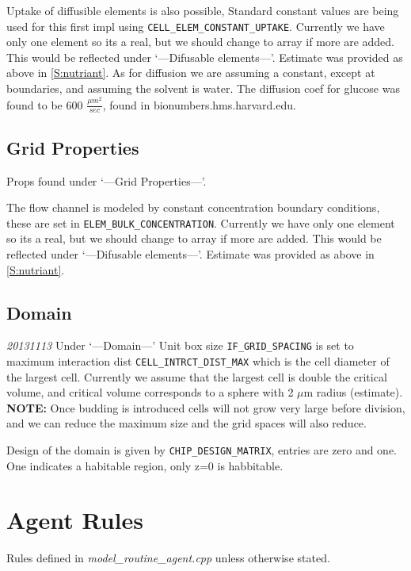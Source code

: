 \documentclass{article}
\begin{document}
Uptake of diffusible elements is also possible,
Standard constant values are being used for this first impl using \texttt{CELL\_ELEM\_CONSTANT\_UPTAKE}.
Currently we have only one element so its a real, 
but we should change to array if more are added.
This would be reflected under `---Difusable elements---'.
Estimate was provided as above in \ref{S:nutriant}.
As for diffusion we are assuming a constant, except at boundaries,
and assuming the solvent is water.
The diffusion coef for glucose was found to be 600 $\frac{\mu m^2}{sec}$,
found in bionumbers.hms.harvard.edu.



\subsection{Grid Properties} 
Props found under `---Grid Properties---'.

The flow channel is modeled by constant concentration boundary conditions, 
these are set in \texttt{ELEM\_BULK\_CONCENTRATION}.
Currently we have only one element so its a real, 
but we should change to array if more are added.
This would be reflected under `---Difusable elements---'.
Estimate was provided as above in \ref{S:nutriant}. 


\subsection{Domain}
\emph{20131113} Under `---Domain---'
Unit box size \texttt{IF\_GRID\_SPACING} is set to maximum interaction dist 
\texttt{CELL\_INTRCT\_DIST\_MAX} which is the cell diameter of the largest cell.
Currently we assume that the largest cell is double the critical volume,
and critical volume corresponds to a sphere with 2 $\mu$m radius (estimate).
\textbf{NOTE:} Once budding is introduced cells will not grow very large before division,
and we can reduce the maximum size and the grid spaces will also reduce.

Design of the domain is given by \texttt{CHIP\_DESIGN\_MATRIX}, 
entries are zero and one.
One indicates a habitable region, only z=0 is habbitable.





\section{Agent Rules}
Rules defined in \textit{model\_routine\_agent.cpp} unless otherwise stated.
\end{document}
